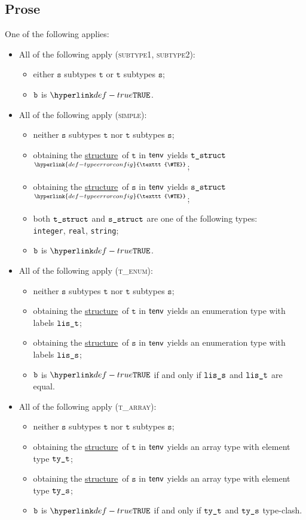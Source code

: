 \documentclass{book}
\newcommand\TypeErrorConfig[0]{\hyperlink{def-typeerrorconfig}{\texttt{\#TE}}}
\newcommand\ProseOrTypeError[0]{\hyperlink{def-proseortypeerror}{$^{\TypeErrorConfig}$}}
\newcommand\structure[0]{\hyperlink{def-structure}{structure}}
\newcommand\vt[0]{\texttt{t}}
\newcommand\vs[0]{\texttt{s}}
\begin{document}
\subsection{Prose}
 One of the following applies:
\begin{itemize}
  \item All of the following apply (\textsc{subtype1}, \textsc{subtype2}):
  \begin{itemize}
    \item either $\vs$ subtypes $\vt$ or $\vt$ subtypes $\vs$;
    \item $\texttt{b}$ is $\True$.
  \end{itemize}

  \item All of the following apply (\textsc{simple}):
  \begin{itemize}
    \item neither $\vs$ subtypes $\vt$ nor $\vt$ subtypes $\vs$;
    \item obtaining the \structure\ of $\vt$ in $\textsf{tenv}$ yields $\texttt{t\_struct}$ \ProseOrTypeError;
    \item obtaining the \structure\ of $\vs$ in $\textsf{tenv}$ yields $\texttt{s\_struct}$ \ProseOrTypeError;
    \item both $\texttt{t\_struct}$ and $\texttt{s\_struct}$ are one of the following types: \\ \texttt{integer}, \texttt{real}, \texttt{string};
    \item $\texttt{b}$ is $\True$.
  \end{itemize}

  \item All of the following apply (\textsc{t\_enum}):
  \begin{itemize}
    \item neither $\vs$ subtypes $\vt$ nor $\vt$ subtypes $\vs$;
    \item obtaining the \structure\ of $\vt$ in $\textsf{tenv}$ yields an enumeration type with labels $\texttt{lis\_t}$;
    \item obtaining the \structure\ of $\vs$ in $\textsf{tenv}$ yields an enumeration type with labels $\texttt{lis\_s}$;
    \item $\texttt{b}$ is $\True$ if and only if $\texttt{lis\_s}$ and $\texttt{lis\_t}$ are equal.
  \end{itemize}

  \item All of the following apply (\textsc{t\_array}):
  \begin{itemize}
    \item neither $\vs$ subtypes $\vt$ nor $\vt$ subtypes $\vs$;
    \item obtaining the \structure\ of $\vt$ in $\textsf{tenv}$ yields an array type with element type $\texttt{ty\_t}$;
    \item obtaining the \structure\ of $\vs$ in $\textsf{tenv}$ yields an array type with element type $\texttt{ty\_s}$;
    \item $\texttt{b}$ is $\True$ if and only if $\texttt{ty\_t}$ and $\texttt{ty\_s}$ type-clash.
  \end{itemize}


\end{itemize}
\end{document}
